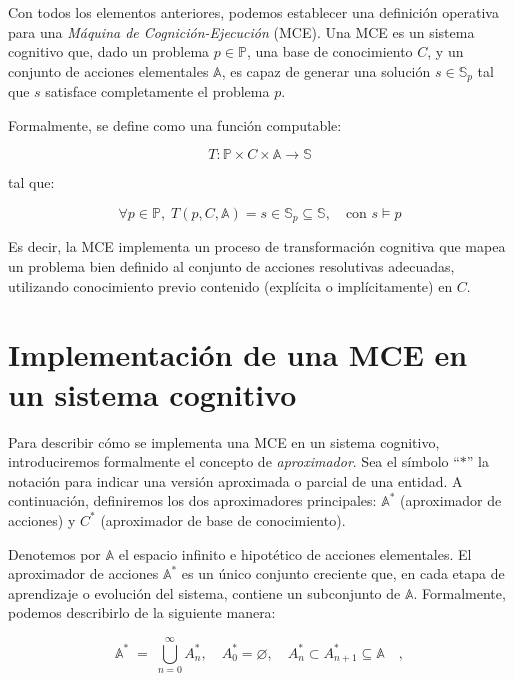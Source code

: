 Con todos los elementos anteriores, podemos establecer una definición operativa
para una \textit{Máquina de Cognición-Ejecución} (MCE). Una MCE es un sistema
cognitivo que, dado un problema $p \in \mathbb{P}$, una base de conocimiento
$C$, y un conjunto de acciones elementales $\mathbb{A}$, es capaz de generar una
solución $s \in \mathbb{S}_p$ tal que $s$ satisface completamente el problema
$p$.

Formalmente, se define como una función computable:

\begin{equation}
 T: \mathbb{P} \times C \times \mathbb{A} \to \mathbb{S}
\end{equation}

tal que:

\begin{equation}
 \forall p \in \mathbb{P}, \; T(p, C, \mathbb{A}) = s \in \mathbb{S}_p
\subseteq \mathbb{S}, \quad \text{con } s \models p
\end{equation}

Es decir, la MCE implementa un proceso de transformación cognitiva que mapea un
problema bien definido al conjunto de acciones resolutivas adecuadas, utilizando
conocimiento previo contenido (explícita o implícitamente) en $C$.

\section{Implementación de una MCE en un sistema cognitivo}

Para describir cómo se implementa una MCE en un sistema cognitivo,
introduciremos formalmente el concepto de \emph{aproximador}. Sea el símbolo
“\(*\)” la notación para indicar una versión aproximada o parcial de una
entidad. A continuación, definiremos los dos aproximadores principales: \(
\mathbb{A}^* \) (aproximador de acciones) y \( C^* \) (aproximador de base de
conocimiento).


Denotemos por \(\mathbb{A}\) el espacio infinito e hipotético de acciones
elementales. El aproximador de acciones \(\mathbb{A}^*\) es un único conjunto
creciente que, en cada etapa de aprendizaje o evolución del sistema, contiene un
subconjunto de \(\mathbb{A}\). Formalmente, podemos describirlo de la siguiente
manera:


\begin{equation}
 \mathbb{A}^* \;=\; \bigcup_{n=0}^{\infty} A_n^*, 
 \quad
 A_0^* =
\varnothing, 
 \quad
 A_n^* \subset A_{n+1}^* \subseteq \mathbb{A} \quad,
\end{equation}

